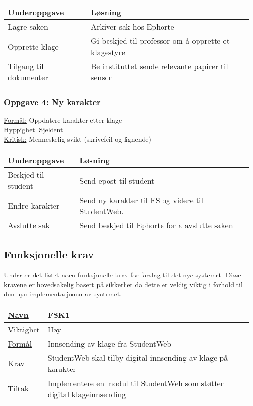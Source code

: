 \begin{tabularx}{\textwidth}{|l|X|}
  \hline
  Underoppgave & Løsning \\ \hline
  Lagre saken & Arkiver sak hos Ephorte \\ \hline
  Opprette klage & Gi beskjed til professor om å opprette et klagestyre \\ \hline
  Tilgang til dokumenter & Be instituttet sende relevante papirer til sensor \\ \hline
\end{tabularx}

\subsubsection*{Oppgave 4: Ny karakter}

\underline{Formål:} Oppdatere karakter etter klage\\
\underline{Hyppighet:} Sjeldent\\
\underline{Kritisk:} Menneskelig svikt (skrivefeil og lignende)

\begin{tabularx}{\textwidth}{|l|X|}
  \hline
  Underoppgave & Løsning \\ \hline
  Beskjed til student & Send epost til student \\ \hline
  Endre karakter & Send ny karakter til FS og videre til StudentWeb. \\ \hline
  Avslutte sak & Send beskjed til Ephorte for å avslutte saken \\ \hline
\end{tabularx}

\subsection{Funksjonelle krav}

Under er det listet noen funksjonelle krav for forslag til det nye systemet. Disse kravene er hovedsakelig basert på sikkerhet da dette er veldig viktig i forhold til den nye
implementasjonen av systemet. 

\begin{tabularx}{\textwidth}{|l|X|}
  \hline
  \underline{Navn} & FSK1 \\ \hline
  \underline{Viktighet} & Høy \\ \hline
  \underline{Formål} & Innsending av klage fra StudentWeb \\ \hline
  \underline{Krav} & StudentWeb skal tilby digital innsending av klage på karakter \\ \hline
  \underline{Tiltak} & Implementere en modul til StudentWeb som støtter digital klageinnsending \\ \hline
\end{tabularx}


